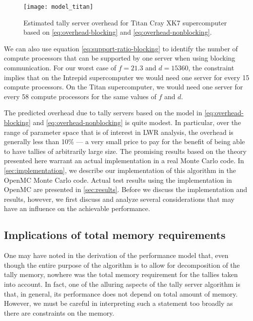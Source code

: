 \documentclass[3p,fleqn]{elsarticle}
\begin{document}
\begin{figure}[htb]
  \centering
  \texttt{[image: model\_titan]}
  \caption{Estimated tally server overhead for Titan Cray XK7 supercomputer
    based on \eqref{eq:overhead-blocking} and \eqref{eq:overhead-nonblocking}.}
  \label{fig:model-titan}
\end{figure}

We can also use equation \eqref{eq:support-ratio-blocking} to identify the
number of compute processors that can be supported by one server when using
blocking communication. For our worst case of $f = 21.3$ and $d = 15360$, the
constraint implies that on the Intrepid supercomputer we would need one server
for every 15 compute processors. On the Titan supercomputer, we would need one
server for every 58 compute processors for the same values of $f$ and $d$.

The predicted overhead due to tally servers based on the model in
\eqref{eq:overhead-blocking} and \eqref{eq:overhead-nonblocking} is quite
modest. In particular, over the range of parameter space that is of interest in
LWR analysis, the overhead is generally less than 10\% --- a very small price to
pay for the benefit of being able to have tallies of arbitrarily large size. The
promising results based on the theory presented here warrant an actual
implementation in a real Monte Carlo code. In \autoref{sec:implementation}, we
describe our implementation of this algorithm in the OpenMC Monte Carlo
code. Actual test results using the implementation in OpenMC are presented in
\autoref{sec:results}. Before we discuss the implementation and results,
however, we first discuss and analyze several considerations that may have an
influence on the achievable performance.

\subsection{Implications of total memory requirements}

One may have noted in the derivation of the performance model that, even though
the entire purpose of the algorithm is to allow for decomposition of the tally
memory, nowhere was the total memory requirement for the tallies taken into
account. In fact, one of the alluring aspects of the tally server algorithm is
that, in general, its performance does not depend on total amount of
memory. However, we must be careful in interpreting such a statement too broadly
as there are constraints on the memory.
\end{document}
